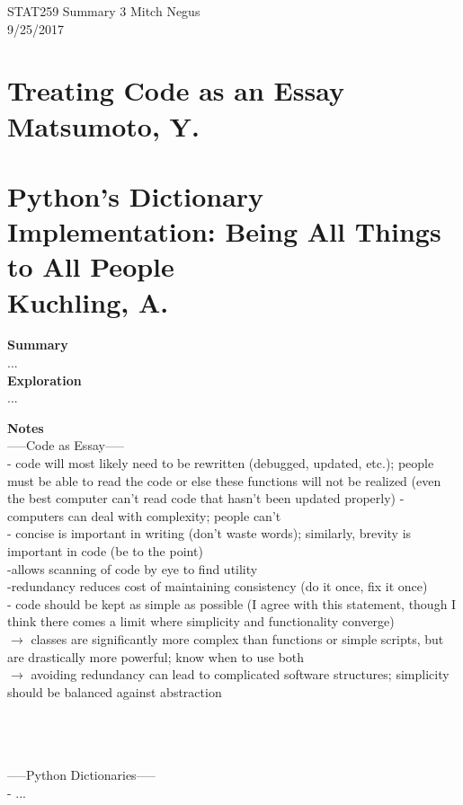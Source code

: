 \documentclass{report}
\newcommand{\tab}{\-\hspace{1cm}}
\begin{document}
\thispagestyle{empty}
\sffamily

\large {STAT259 Summary {3} \hfill Mitch Negus\\
		\hspace*{\fill} 9/25/2017\\ }
\section*{\textsf{Treating Code as an Essay \\ \normalsize Matsumoto, Y.}}
\section*{\textsf{Python’s Dictionary Implementation: Being All Things to All People \\ \normalsize Kuchling, A.}}

\textbf{Summary}\\
\tab ...
\-\\
\textbf{Exploration}\\
\tab ...

\newpage

\textbf{Notes}\\

-----Code as Essay-----\\
- code will most likely need to be rewritten (debugged, updated, etc.); people must be able to read the code or else these functions will not be realized (even the best computer can't read code that hasn't been updated properly)
- computers can deal with complexity; people can't \\
- concise is important in writing (don't waste words); similarly, brevity is important in code (be to the point)\\
	\tab -allows scanning of code by eye to find utility \\
	\tab -redundancy reduces cost of maintaining consistency (do it once, fix it once) \\
- code should be kept as simple as possible (I agree with this statement, though I think there comes a limit where simplicity and functionality converge)\\
	\tab $\rightarrow$ classes are significantly more complex than functions or simple scripts, but are drastically more powerful; know when to use both\\
	\tab $\rightarrow$ avoiding redundancy can lead to complicated software structures; simplicity should be balanced against abstraction

\-\\
\-\\
\-\\
-----Python Dictionaries-----\\
- ...
\end{document}
